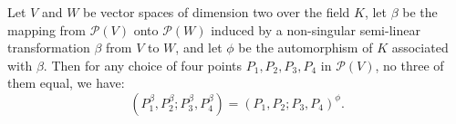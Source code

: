 Let $V$ and $W$ be vector spaces of dimension two over the field $K$, let $\beta$ be the mapping from $\mathcal{P}(V)$ onto $\mathcal{P}(W)$ induced by a non-singular semi-linear transformation $\beta$ from $V$ to $W$, and let $\phi$ be the automorphism of $K$ associated with $\beta$. Then for any choice of four points $P_1, P_2, P_3, P_4$ in $\mathcal{P}(V)$, no three of them equal, we have:
$$(P_1^\beta, P_2^\beta; P_3^\beta, P_4^\beta) = (P_1, P_2; P_3, P_4)^\phi.$$
